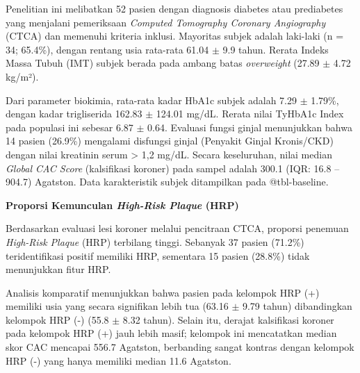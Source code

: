 \documentclass[
  indonesian,
]{agujournal2019}
\begin{document}
Penelitian ini melibatkan 52 pasien dengan diagnosis diabetes atau
prediabetes yang menjalani pemeriksaan \emph{Computed Tomography
Coronary Angiography} (CTCA) dan memenuhi kriteria inklusi. Mayoritas
subjek adalah laki-laki (n = 34; 65.4\%), dengan rentang usia rata-rata
61.04 \(\pm\) 9.9 tahun. Rerata Indeks Massa Tubuh (IMT) subjek berada
pada ambang batas \emph{overweight} (27.89 \(\pm\) 4.72 kg/m²).

Dari parameter biokimia, rata-rata kadar HbA1c subjek adalah 7.29
\(\pm\) 1.79\%, dengan kadar trigliserida 162.83 \(\pm\) 124.01 mg/dL.
Rerata nilai TyHbA1c Index pada populasi ini sebesar 6.87 \(\pm\) 0.64.
Evaluasi fungsi ginjal menunjukkan bahwa 14 pasien (26.9\%) mengalami
disfungsi ginjal (Penyakit Ginjal Kronis/CKD) dengan nilai kreatinin
serum \textgreater{} 1,2 mg/dL. Secara keseluruhan, nilai median
\emph{Global CAC Score} (kalsifikasi koroner) pada sampel adalah 300.1
(IQR: 16.8 -- 904.7) Agatston. Data karakteristik subjek ditampilkan
pada @tbl-baseline.

\textbf{Proporsi Kemunculan \emph{High-Risk Plaque} (HRP)}

Berdasarkan evaluasi lesi koroner melalui pencitraan CTCA, proporsi
penemuan \emph{High-Risk Plaque} (HRP) terbilang tinggi. Sebanyak 37
pasien (71.2\%) teridentifikasi positif memiliki HRP, sementara 15
pasien (28.8\%) tidak menunjukkan fitur HRP.

Analisis komparatif menunjukkan bahwa pasien pada kelompok HRP (+)
memiliki usia yang secara signifikan lebih tua (63.16 \(\pm\) 9.79
tahun) dibandingkan kelompok HRP (-) (55.8 \(\pm\) 8.32 tahun). Selain
itu, derajat kalsifikasi koroner pada kelompok HRP (+) jauh lebih masif;
kelompok ini mencatatkan median skor CAC mencapai 556.7 Agatston,
berbanding sangat kontras dengan kelompok HRP (-) yang hanya memiliki
median 11.6 Agatston.
\end{document}
